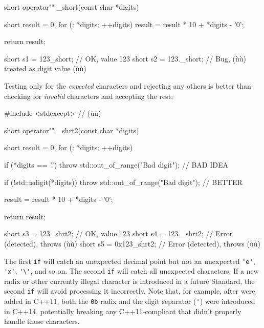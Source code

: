\begin{emcppslisting}
short operator"" _short(const char *digits)
{
    short result = 0;
    for (; *digits; ++digits)
    {
        result = result * 10 + *digits - '0';
    }

    return result;
}

short s1 = 123_short;   // OK, value 123
short s2 = 123._short;  // Bug, (ù{}ù) treated as digit value (ù{}ù)
\end{emcppslisting}
    
\noindent Testing only for the \emph{expected} characters and rejecting any others
is better than checking for \emph{invalid} characters and accepting the
rest:

\begin{emcppslisting}
#include <stdexcept>  // (ù{}ù)

short operator"" _shrt2(const char *digits)
{
    short result = 0;
    for (; *digits; ++digits)
    {
        if (*digits == '.')
        {
            throw std::out_of_range("Bad digit");  // BAD IDEA
        }

        if (!std::isdigit(*digits))
        {
            throw std::out_of_range("Bad digit");  // BETTER
        }

        result = result * 10 + *digits - '0';
    }

    return result;
}

short s3 = 123_shrt2;    // OK, value 123
short s4 = 123._shrt2;   // Error (detected), throws (ù{}ù)
short s5 = 0x123_shrt2;  // Error (detected), throws (ù{}ù)
\end{emcppslisting}
    
\noindent The first \lstinline!if! will catch an unexpected decimal point but not an
unexpected \lstinline!'e'!, \lstinline!'x'!, \lstinline!'\'!, 
and so
on. The second \lstinline!if! will catch all unexpected characters. If a
new radix or other currently illegal character is introduced in a future
Standard, the second \lstinline!if! will avoid processing it incorrectly.
Note that, for example, after  were added in C++11, both
the \lstinline!0b! radix and the digit separator (\lstinline!'!) were
introduced in C++14, potentially breaking any C++11-compliant
 that didn't properly handle those characters.


